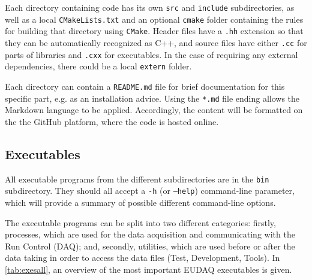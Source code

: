 Each directory containing code has its own \texttt{src} and \texttt{include} subdirectories,
as well as a local \texttt{CMakeLists.txt} and an optional \texttt{cmake} folder containing the rules
for building that directory using \texttt{CMake}.
Header files have a \texttt{.hh} extension so that they can be automatically recognized as C++,
and source files have either \texttt{.cc} for parts of libraries and \texttt{.cxx} for executables.
In the case of requiring any external dependencies, there could be a local \texttt{extern} folder.

Each directory can contain a \texttt{README.md} file for brief documentation for this specific part, e.g.  
as an installation advice. 
Using the \texttt{*.md} file ending allows the Markdown language \cite{markdownWWW} to be applied. 
Accordingly, the content will be formatted on the the GitHub platform, where the code is hosted online.

\subsection{Executables}
All executable programs from the different subdirectories are in the \texttt{bin} subdirectory. They should all accept a \texttt{-h} (or \texttt{--help}) command-line parameter, which will provide a summary of possible different command-line options.

The executable programs can be split into two different categories: firstly, processes, which are used for the data acquisition and communicating with the Run Control (DAQ); and, secondly, utilities, which are used before or after the data taking in order to access the data files (Test, Development, Tools).
In \autoref{tab:exesall}, an overview of the most important EUDAQ executables is given.

